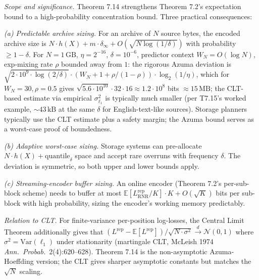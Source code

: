 \documentclass[
]{article}
\begin{document}
\emph{Scope and significance.} Theorem 7.14 strengthens Theorem 7.2's
expectation bound to a high-probability concentration bound. Three
practical consequences:

\emph{(a) Predictable archive sizing.} For an archive of $N$ source
bytes, the encoded archive size is $N \cdot h(X) + m \cdot \delta_\infty +
O(\sqrt{N \log(1/\delta)})$ with probability $\geq 1 - \delta$. For
$N = 1\,\mathrm{GB}$, $\eta = 2^{-16}$, $\delta = 10^{-6}$, predictor
context $W_N = O(\log N)$, exp-mixing rate $\rho$ bounded away from
$1$: the rigorous Azuma deviation is
$\sqrt{2 \cdot 10^9 \cdot \log(2/\delta)} \cdot (W_N + 1 + \rho/(1-\rho))
\cdot \log_2(1/\eta)$, which for $W_N = 30, \rho = 0.5$ gives
$\sqrt{5.6 \cdot 10^{10}} \cdot 32 \cdot 16 \approx 1.2 \cdot 10^8$ bits
$\approx 15\,\mathrm{MB}$; the CLT-based estimate via empirical
$\sigma_{\ell_1}^2$ is typically much smaller (per T7.15's worked example,
$\sim 43\,\mathrm{kB}$ at the same $\delta$ for English-text-like
sources). Storage planners typically use the CLT estimate plus a
safety margin; the Azuma bound serves as a worst-case proof of
boundedness.

\emph{(b) Adaptive worst-case sizing.} Storage systems can pre-allocate
$N \cdot h(X) + \mathrm{quantile}_\delta$ space and accept rare overruns
with frequency $\delta$. The deviation is symmetric, so both upper and
lower bounds apply.

\emph{(c) Streaming-encoder buffer sizing.} An online encoder
(Theorem 7.2's per-sub-block scheme) needs to buffer at most
$\mathbb{E}[L^{\mathrm{rep}}_{\mathrm{RNR}}/K] \cdot K + O(\sqrt{K})$ bits
per sub-block with high probability, sizing the encoder's working
memory predictably.

\emph{Relation to CLT.} For finite-variance per-position log-losses,
the Central Limit Theorem additionally gives that
$(L^{\mathrm{rep}} - \mathbb{E}[L^{\mathrm{rep}}])/\sqrt{N \cdot \sigma^2}
\xrightarrow{d} \mathcal{N}(0, 1)$ where $\sigma^2 = \mathrm{Var}(\ell_1)$
under stationarity (martingale CLT, McLeish 1974 \emph{Ann.\ Probab.}\
2(4):620--628). Theorem 7.14 is the non-asymptotic Azuma-Hoeffding
version; the CLT gives sharper asymptotic constants but matches the
$\sqrt{N}$ scaling.
\end{document}
